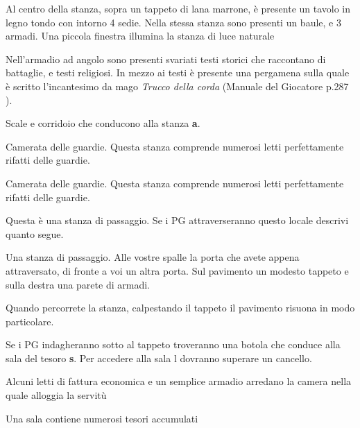 \documentclass[letterpaper,twocolumn,openany,nodeprecatedcode]{dndbook}
\begin{document}
\begin{DndReadAloud}
Al centro della stanza, sopra un tappeto di lana marrone, è presente un tavolo in legno tondo con intorno 4 sedie. Nella stessa stanza sono presenti un baule, e 3 armadi. Una piccola finestra illumina la stanza di luce naturale

Nell'armadio ad angolo sono presenti svariati testi storici che raccontano di battaglie, e testi religiosi. In mezzo ai testi è presente una pergamena sulla quale è scritto l'incantesimo da mago \textit{Trucco della corda} (Manuale del Giocatore p.287 \cite{dnd:giocatore}).
\end{DndReadAloud}

Scale e corridoio che conducono alla stanza \textbf{a}.

Camerata delle guardie. Questa stanza comprende numerosi letti perfettamente rifatti delle guardie.

Camerata delle guardie. Questa stanza comprende numerosi letti perfettamente rifatti delle guardie.

Questa è una stanza di passaggio. Se i PG attraverseranno questo locale descrivi quanto segue.
\begin{DndReadAloud}
Una stanza di passaggio. Alle vostre spalle la porta che avete appena attraversato, di fronte a voi un altra porta. Sul pavimento un modesto tappeto e sulla destra una parete di armadi.

Quando percorrete la stanza, calpestando il tappeto il pavimento risuona in modo particolare.
\end{DndReadAloud}

Se i PG indagheranno sotto al tappeto troveranno una botola che conduce alla sala del tesoro \textbf{s}. Per accedere alla sala l dovranno superare un cancello.

Alcuni letti di fattura economica e un semplice armadio arredano la camera nella quale alloggia la servitù

Una sala contiene numerosi tesori accumulati
\end{document}
